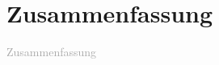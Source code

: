 \thispagestyle{empty}
\chapter*{Zusammenfassung}
\label{sec:Zusammenfassung}
\textcolor{darkgray}{
  Zusammenfassung
}
